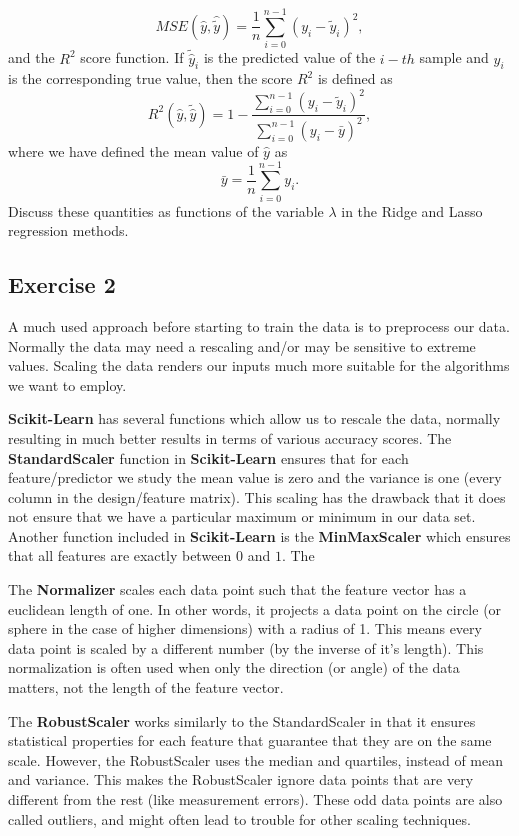 \documentclass[%
oneside,                 %
final,                   %
10pt]{article}
\begin{document}
\noindent
\[ MSE(\hat{y},\hat{\tilde{y}}) = \frac{1}{n}
\sum_{i=0}^{n-1}(y_i-\tilde{y}_i)^2, 
\] 
and the $R^2$ score function.
If $\tilde{\hat{y}}_i$ is the predicted value of the $i-th$ sample and $y_i$ is the corresponding true value, then the score $R^2$ is defined as
\[
R^2(\hat{y}, \tilde{\hat{y}}) = 1 - \frac{\sum_{i=0}^{n - 1} (y_i - \tilde{y}_i)^2}{\sum_{i=0}^{n - 1} (y_i - \bar{y})^2},
\]
where we have defined the mean value  of $\hat{y}$ as
\[
\bar{y} =  \frac{1}{n} \sum_{i=0}^{n - 1} y_i.
\]
Discuss these quantities as functions of the variable $\lambda$ in the Ridge and Lasso regression methods. 

\subsection*{Exercise 2}


A much used approach before starting to train the data is  to preprocess our
data. Normally the data may need a rescaling and/or may be sensitive
to extreme values. Scaling the data renders our inputs much more
suitable for the algorithms we want to employ.

\textbf{Scikit-Learn} has several functions which allow us to rescale the
data, normally resulting in much better results in terms of various
accuracy scores.  The \textbf{StandardScaler} function in \textbf{Scikit-Learn}
ensures that for each feature/predictor we study the mean value is
zero and the variance is one (every column in the design/feature
matrix).  This scaling has the drawback that it does not ensure that
we have a particular maximum or minimum in our data set. Another
function included in \textbf{Scikit-Learn} is the \textbf{MinMaxScaler} which
ensures that all features are exactly between $0$ and $1$. The


The \textbf{Normalizer} scales each data
point such that the feature vector has a euclidean length of one. In other words, it
projects a data point on the circle (or sphere in the case of higher dimensions) with a
radius of 1. This means every data point is scaled by a different number (by the
inverse of it’s length).
This normalization is often used when only the direction (or angle) of the data matters,
not the length of the feature vector.

The \textbf{RobustScaler} works similarly to the StandardScaler in that it
ensures statistical properties for each feature that guarantee that
they are on the same scale. However, the RobustScaler uses the median
and quartiles, instead of mean and variance. This makes the
RobustScaler ignore data points that are very different from the rest
(like measurement errors). These odd data points are also called
outliers, and might often lead to trouble for other scaling
techniques.
\end{document}
